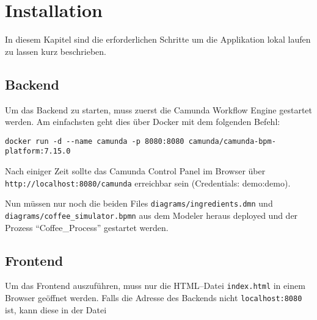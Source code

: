 \chapter{Installation}\label{ch:installation}
In diesem Kapitel sind die erforderlichen Schritte um die Applikation lokal laufen zu lassen kurz beschrieben.


\section{Backend}\label{sec:backend}
Um das Backend zu starten, muss zuerst die Camunda Workflow Engine gestartet werden.
Am einfachsten geht dies über Docker mit dem folgenden Befehl:

\begin{verbatim}
docker run -d --name camunda -p 8080:8080 camunda/camunda-bpm-platform:7.15.0
\end{verbatim}

Nach einiger Zeit sollte das Camunda Control Panel im Browser über \texttt{http://localhost:8080/camunda} erreichbar sein (Credentials: demo:demo).

Nun müssen nur noch die beiden Files \texttt{diagrams/ingredients.dmn} und \texttt{diagrams/coffee_simulator.bpmn} aus dem Modeler heraus deployed und der Prozess ``Coffee\_Process'' gestartet werden.


\section{Frontend}\label{sec:frontend}
Um das Frontend auszuführen, muss nur die HTML--Datei \texttt{index.html} in einem Browser geöffnet werden.
Falls die Adresse des Backends nicht \texttt{localhost:8080} ist, kann diese in der Datei %
